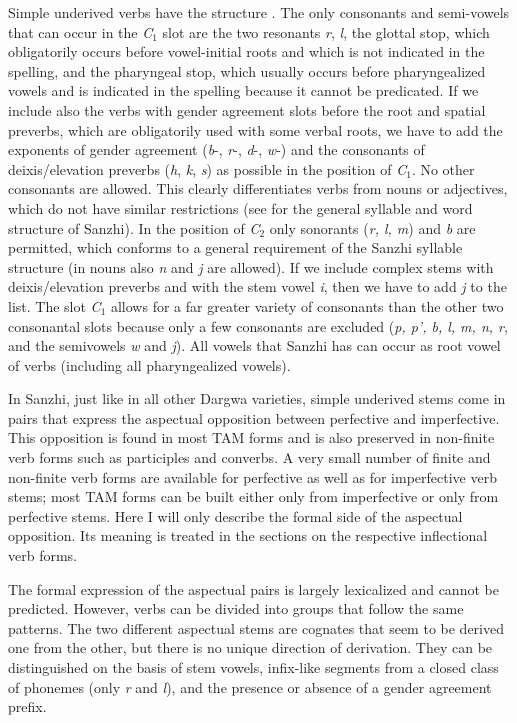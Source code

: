 Simple underived verbs have the structure . The only consonants and semi-vowels that can occur in the \textit{C$_{1}$} slot are the two resonants \textit{r}, \textit{l}, the glottal stop, which obligatorily occurs before vowel-initial roots and which is not indicated in the spelling, and the pharyngeal stop, which usually occurs before pharyngealized vowels and is indicated in the spelling because it cannot be predicated. If we include also the verbs with gender agreement slots before the root and spatial preverbs, which are obligatorily used with some verbal roots, we have to add the exponents of gender agreement (\textit{b}-, \textit{r}-, \textit{d}-, \textit{w}-) and the consonants of deixis/elevation preverbs (\textit{h}, \textit{k}, \textit{s}) as possible in the position of \textit{C$_{1}$}. No other consonants are allowed. This clearly differentiates verbs from nouns or adjectives, which do not have similar restrictions (see  for the general syllable and word structure of Sanzhi). In the position of \textit{C$_{2}$} only sonorants (\textit{r, l, m}) and \textit{b} are permitted, which conforms to a general requirement of the Sanzhi syllable structure (in nouns also \textit{n} and \textit{j} are allowed). If we include complex stems with deixis/elevation preverbs and with the stem vowel \textit{i}, then we have to add \textit{j} to the list. The slot \textit{C$_{1}$} allows for a far greater variety of consonants than the other two consonantal slots because only a few consonants are excluded (\textit{p, p', b, l, m, n, r}, and the semivowels \textit{w} and \textit{j}). All vowels that Sanzhi has can occur as root vowel of verbs (including all pharyngealized vowels).

In Sanzhi, just like in all other Dargwa varieties, simple underived stems come in pairs that express the aspectual opposition between perfective and imperfective. This opposition is found in most TAM forms and is also preserved in non-finite verb forms such as participles and converbs. A very small number of finite and non-finite verb forms are available for perfective as well as for imperfective verb stems; most TAM forms can be built either only from imperfective or only from perfective stems. Here I will only describe the formal side of the aspectual opposition. Its meaning is treated in the sections on the respective inflectional verb forms.

The formal expression of the aspectual pairs is largely lexicalized and cannot be predicted. However, verbs can be divided into groups that follow the same patterns. The two different aspectual stems are cognates that seem to be derived one from the other, but there is no unique direction of derivation. They can be distinguished on the basis of stem vowels, infix-like segments from a closed class of phonemes (only \textit{r} and \textit{l}), and the presence or absence of a gender agreement prefix.

